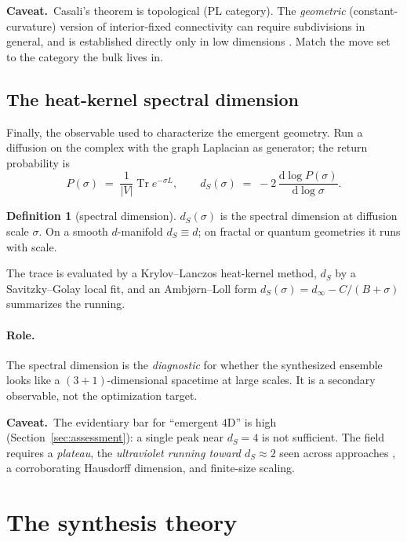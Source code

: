 \documentclass[11pt]{article}
\DeclareMathOperator{\Tr}{Tr}
\newcommand{\abs}[1]{\lvert #1 \rvert}
\newcommand{\dd}{\mathrm{d}}
\theoremstyle{definition}
\newtheorem{definition}{Definition}[section]
\theoremstyle{plain}
\newcommand{\caveat}[1]{\par\noindent\textcolor{red!60!black}{\textbf{Caveat.}}\ #1\par}
\begin{document}
\caveat{Casali's theorem is topological (PL category). The \emph{geometric}
(constant-curvature) version of interior-fixed connectivity can require subdivisions in
general, and is established directly only in low dimensions \cite{kalelkar2019}. Match the
move set to the category the bulk lives in.}

\subsection{The heat-kernel spectral dimension}
\label{sec:specdim}

Finally, the observable used to characterize the emergent geometry. Run a diffusion on the
complex with the graph Laplacian as generator; the return probability is
\begin{equation}
P(\sigma)\;=\;\frac{1}{\abs{V}}\Tr e^{-\sigma L},\qquad
d_S(\sigma)\;=\;-2\,\frac{\dd\log P(\sigma)}{\dd\log\sigma}.
\label{eq:specdim}
\end{equation}

\begin{definition}[spectral dimension]
$d_S(\sigma)$ is the spectral dimension at diffusion scale $\sigma$. On a smooth
$d$-manifold $d_S\equiv d$; on fractal or quantum geometries it runs with scale.
\end{definition}

The trace is evaluated by a Krylov--Lanczos heat-kernel method, $d_S$ by a Savitzky--Golay
local fit, and an Ambj\o rn--Loll form $d_S(\sigma)=d_\infty - C/(B+\sigma)$ summarizes the
running.

\paragraph{Role.} The spectral dimension is the \emph{diagnostic} for whether the
synthesized ensemble looks like a $(3{+}1)$-dimensional spacetime at large scales. It is a
secondary observable, not the optimization target.

\caveat{The evidentiary bar for ``emergent $4$D'' is high (Section~\ref{sec:assessment}): a
single peak near $d_S=4$ is not sufficient. The field requires a \emph{plateau}, the
\emph{ultraviolet running toward $d_S\approx 2$} seen across approaches
\cite{ambjorn2005spectral,carlip2017}, a corroborating Hausdorff dimension, and finite-size
scaling.}

\section{The synthesis theory}
\label{sec:synthesis}
\end{document}
